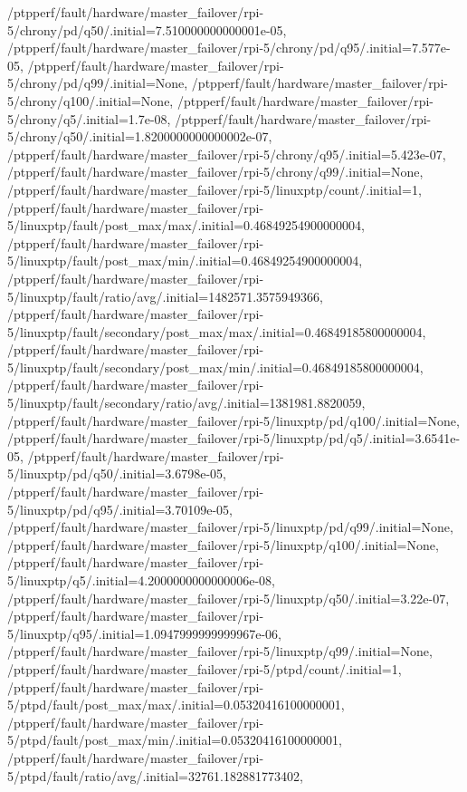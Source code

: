 {    /ptpperf/fault/hardware/master_failover/rpi-5/chrony/pd/q50/.initial=7.510000000000001e-05,
    /ptpperf/fault/hardware/master_failover/rpi-5/chrony/pd/q95/.initial=7.577e-05,
    /ptpperf/fault/hardware/master_failover/rpi-5/chrony/pd/q99/.initial=None,
    /ptpperf/fault/hardware/master_failover/rpi-5/chrony/q100/.initial=None,
    /ptpperf/fault/hardware/master_failover/rpi-5/chrony/q5/.initial=1.7e-08,
    /ptpperf/fault/hardware/master_failover/rpi-5/chrony/q50/.initial=1.8200000000000002e-07,
    /ptpperf/fault/hardware/master_failover/rpi-5/chrony/q95/.initial=5.423e-07,
    /ptpperf/fault/hardware/master_failover/rpi-5/chrony/q99/.initial=None,
    /ptpperf/fault/hardware/master_failover/rpi-5/linuxptp/count/.initial=1,
    /ptpperf/fault/hardware/master_failover/rpi-5/linuxptp/fault/post_max/max/.initial=0.46849254900000004,
    /ptpperf/fault/hardware/master_failover/rpi-5/linuxptp/fault/post_max/min/.initial=0.46849254900000004,
    /ptpperf/fault/hardware/master_failover/rpi-5/linuxptp/fault/ratio/avg/.initial=1482571.3575949366,
    /ptpperf/fault/hardware/master_failover/rpi-5/linuxptp/fault/secondary/post_max/max/.initial=0.46849185800000004,
    /ptpperf/fault/hardware/master_failover/rpi-5/linuxptp/fault/secondary/post_max/min/.initial=0.46849185800000004,
    /ptpperf/fault/hardware/master_failover/rpi-5/linuxptp/fault/secondary/ratio/avg/.initial=1381981.8820059,
    /ptpperf/fault/hardware/master_failover/rpi-5/linuxptp/pd/q100/.initial=None,
    /ptpperf/fault/hardware/master_failover/rpi-5/linuxptp/pd/q5/.initial=3.6541e-05,
    /ptpperf/fault/hardware/master_failover/rpi-5/linuxptp/pd/q50/.initial=3.6798e-05,
    /ptpperf/fault/hardware/master_failover/rpi-5/linuxptp/pd/q95/.initial=3.70109e-05,
    /ptpperf/fault/hardware/master_failover/rpi-5/linuxptp/pd/q99/.initial=None,
    /ptpperf/fault/hardware/master_failover/rpi-5/linuxptp/q100/.initial=None,
    /ptpperf/fault/hardware/master_failover/rpi-5/linuxptp/q5/.initial=4.2000000000000006e-08,
    /ptpperf/fault/hardware/master_failover/rpi-5/linuxptp/q50/.initial=3.22e-07,
    /ptpperf/fault/hardware/master_failover/rpi-5/linuxptp/q95/.initial=1.0947999999999967e-06,
    /ptpperf/fault/hardware/master_failover/rpi-5/linuxptp/q99/.initial=None,
    /ptpperf/fault/hardware/master_failover/rpi-5/ptpd/count/.initial=1,
    /ptpperf/fault/hardware/master_failover/rpi-5/ptpd/fault/post_max/max/.initial=0.05320416100000001,
    /ptpperf/fault/hardware/master_failover/rpi-5/ptpd/fault/post_max/min/.initial=0.05320416100000001,
    /ptpperf/fault/hardware/master_failover/rpi-5/ptpd/fault/ratio/avg/.initial=32761.182881773402,
}
